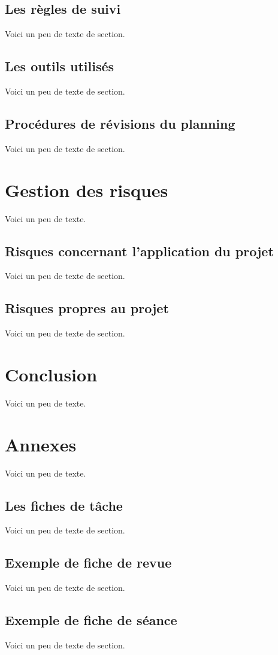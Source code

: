     \section{Les règles de suivi}
    Voici un peu de texte de section.
    \section{Les outils utilisés}
    Voici un peu de texte de section.
    \section{Procédures de révisions du planning}
    Voici un peu de texte de section.
    
    \chapter{Gestion des risques}
    Voici un peu de texte.
    \section{Risques concernant l'application du projet}
    Voici un peu de texte de section.
    \section{Risques propres au projet}
    Voici un peu de texte de section.
    
    \chapter{Conclusion}
    Voici un peu de texte.
    
    \chapter{Annexes}
    Voici un peu de texte.
    \section{Les fiches de tâche}
    Voici un peu de texte de section.
    \section{Exemple de fiche de revue}
    Voici un peu de texte de section.
    \section{Exemple de fiche de séance}
    Voici un peu de texte de section.



